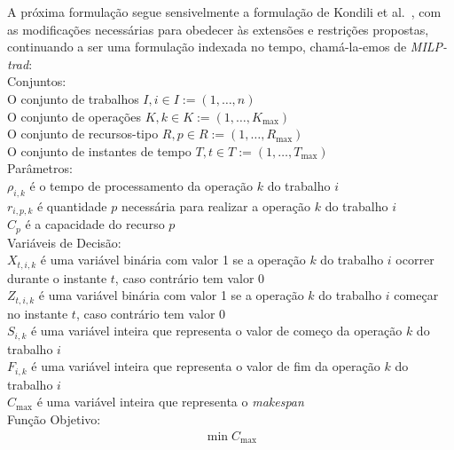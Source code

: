 A próxima formulação segue sensivelmente a formulação de Kondili et al.~\cite{kondiliGeneralAlgorithmShortterm1993}, com as modificações necessárias para obedecer às extensões e restrições propostas, continuando a ser uma formulação indexada no tempo, chamá-la-emos de \textit{MILP-trad}:\\

Conjuntos:\\
O conjunto de trabalhos $I, i \in I := (1, \ldots, n)$ \\
O conjunto de operações $K, k \in K := (1, \ldots, K_{\max})$ \\
O conjunto de recursos-tipo $R, p \in R := (1, \ldots, R_{\max})$ \\
O conjunto de instantes de tempo $T, t \in T := (1, \ldots, T_{\max})$ \\

Parâmetros:\\
$\rho_{i,k}$ é o tempo de processamento da operação $k$ do trabalho $i$ \\
$r_{i,p,k}$ é quantidade $p$ necessária para realizar a operação $k$ do trabalho $i$ \\
$C_{p}$ é a capacidade do recurso $p$ \\

Variáveis de Decisão: \\
$X_{t,i,k}$ é uma variável binária com valor 1 se a operação $k$ do trabalho $i$ ocorrer durante o instante $t$, caso contrário tem valor 0 \\
$Z_{t,i,k}$ é uma variável binária com valor 1 se a operação $k$ do trabalho $i$ começar no instante $t$, caso contrário tem valor 0 \\
$S_{i,k}$ é uma variável inteira que representa o valor de começo da operação $k$ do trabalho $i$ \\
$F_{i,k}$ é uma variável inteira que representa o valor de fim da operação $k$ do trabalho $i$ \\
$C_{\max}$ é uma variável inteira que representa o \textit{makespan} \\

Função Objetivo:
\begin{align}
\min C_{\max} \label{eq:1}
\end{align}

